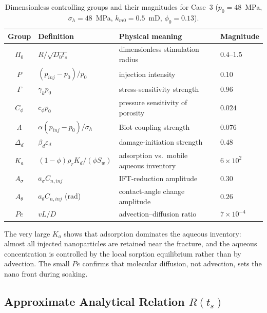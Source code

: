 \begin{table}[h!t]
\centering
\caption{Dimensionless controlling groups and their magnitudes for Case~3
($p_0=48$~MPa, $\sigma_h=48$~MPa, $k_{m0}=0.5$~mD, $\phi_0=0.13$).}
\label{tbl:pi_groups}
\small
\begin{tabular}{clll}
\toprule[1.5pt]
Group & Definition & Physical meaning & Magnitude\\
\midrule[1pt]
$\Pi_0$ & $R/\sqrt{D_0t_s}$ & dimensionless stimulation radius & $0.4$--$1.5$\\
$P$ & $(p_{inj}-p_0)/p_0$ & injection intensity & $0.10$\\
$\Gamma$ & $\gamma_k p_0$ & stress-sensitivity strength & $0.96$\\
$C_\phi$ & $c_\phi p_0$ & pressure sensitivity of porosity & $0.024$\\
$\Lambda$ & $\alpha(p_{inj}-p_0)/\sigma_h$ & Biot coupling strength & $0.076$\\
$\Delta_d$ & $\beta_d\varepsilon_d$ & damage-initiation strength & $0.48$\\
$K_a$ & $(1-\phi)\rho_rK_d/(\phi S_w)$ & adsorption vs.\ mobile aqueous inventory
& $6\times10^{2}$\\
$A_\sigma$ & $a_\sigma C_{n,inj}$ & IFT-reduction amplitude & $0.30$\\
$A_\theta$ & $a_\theta C_{n,inj}$ (rad) & contact-angle change amplitude & $0.26$\\
$Pe$ & $vL/D$ & advection--diffusion ratio & $7\times10^{-4}$\\
\bottomrule[1.5pt]
\end{tabular}
\end{table}

The very large $K_a$ shows that adsorption dominates the aqueous inventory:
almost all injected nanoparticles are retained near the fracture, and the
aqueous concentration is controlled by the local sorption equilibrium rather
than by advection. The small $Pe$ confirms that molecular diffusion, not
advection, sets the nano front during soaking.

\subsection{Approximate Analytical Relation $R(t_s)$}

